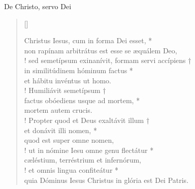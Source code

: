


\def\greinitialformat#1{%
{\fontsize{39}{39}\selectfont #1}%
}




\vspace{0.3cm}
\begin{center}

De Christo, servo Dei\\
\end{center}
\begin{verse}[\versewidth]
	

Christus Iesus, cum in forma Dei esset, *\\
non rapínam arbitrátus est
	esse se æquálem Deo,\\!
\vin sed semetípsum exinanívit, formam servi accípiens †\\
\vin in similitúdinem hóminum factus *\\
\vin et hábitu invéntus ut homo.\\!
Humiliávit semetípsum †\\
factus obóediens usque ad mortem, *\\
mortem autem crucis.\\!
\vin Propter quod et Deus exaltávit illum †\\
\vin et donávit illi nomen, *\\
\vin quod est super omne nomen,\\!
ut in nómine Iesu omne genu flectátur *\\
cæléstium, terréstrium et infernórum,\\!
\vin et omnis lingua confiteátur *\\
\vin quia Dóminus Iesus Christus
	in glória est Dei Patris.\\
\end{verse}
\vspace{1cm}


